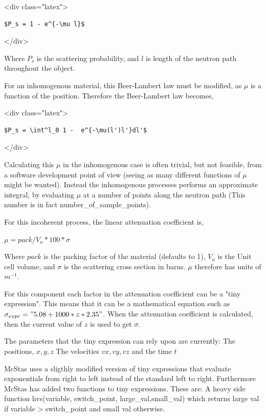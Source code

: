 \textless{}div class="latex"\textgreater{}

\begin{verbatim}
$P_s = 1 - e^{-\mu l}$
\end{verbatim}

\textless{}/div\textgreater{}

Where $P_s$ is the scattering probability, and $l$ is length of the neutron path throughout the object.

For an inhomogenous material, this Beer-Lambert law must be modified, as $\mu$ is a function of the position. Therefore the Beer-Lambert law becomes,

\textless{}div class="latex"\textgreater{}

\begin{verbatim}
$P_s = \int^l_0 1 -  e^{-\mu(l')l'}dl'$
\end{verbatim}

\textless{}/div\textgreater{}

Calculating this $\mu$ in the inhomogenous case is often trivial, but not feasible, from a software development point of view (seeing as many different functions of $\mu$ might be wanted). Instead the inhomogenous processes performs an approximate integral, by evaluating $\mu$ at a number of points along the neutron path (This number is in fact number\_of\_sample\_points).

For this incoherent process, the linear attenuation coefficient is,

$\mu = pack/V_u * 100 * \sigma$

Where $pack$ is the packing factor of the material (defaults to 1), $V_u$ is the Unit cell volume, and $\sigma$ is the scattering cross section in barns. $\mu$ therefore has units of $m^{-1}$.

For this component each factor in the attenuation coefficient can be a "tiny expression". This means that it can be a mathematical equation such as $\sigma_{expr} = "5.08 + 1000 * z * 2.35"$. When the attenuation coefficient is calculated, then the current value of $z$ is used to get $\sigma$.

The parameters that the tiny expression can rely upon are currently: The positions, $x, y, z$ The velocities $vx, vy, vz$ and the time $t$

McStas uses a sligthly modified version of tiny expressions that evaluate exponentials from right to left instead of the standard left to right. Furthermore McStas has added two functions to tiny expressions. These are: A heavy side function hvs(variable, switch\_point, large\_val,small\_val) which returns large val if variable \textgreater{} switch\_point and small val otherwise.

